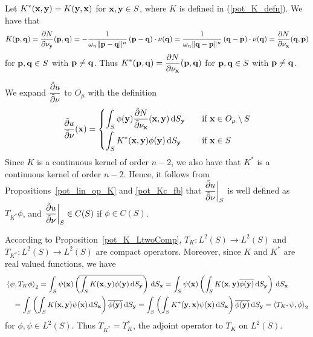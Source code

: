 Let $\displaystyle K^\ast(\mathbf{x},\mathbf{y}) = K(\mathbf{y},\mathbf{x})$
for $\mathbf{x},\mathbf{y} \in S$,  where $K$ is defined in
(\ref{pot_K_defn}).  We have that
\[
K(\mathbf{p},\mathbf{q}) = \frac{\partial{N}}{\partial \mathbf{\nu}_{\mathbf{y}}}(\mathbf{p},\mathbf{q})
= - \frac{1}{\omega_n \|\mathbf{p}-\mathbf{q}\|^n}\,(\mathbf{p}-\mathbf{q})\cdot
\mathbf{\nu}(\mathbf{q})
= \frac{1}{\omega_n \|\mathbf{q}-\mathbf{p}\|^n}\,(\mathbf{q}-\mathbf{p})\cdot
\mathbf{\nu}(\mathbf{q})
= \frac{\partial{N}}{\partial \mathbf{\nu}_{\mathbf{x}}}(\mathbf{q},\mathbf{p})
\]
for $\mathbf{p} , \mathbf{q} \in S$ with $\mathbf{p} \neq \mathbf{q}$.  Thus
$\displaystyle K^\ast(\mathbf{p},\mathbf{q}) =
\frac{\partial{N}}{\partial \mathbf{\nu}_{\mathbf{x}}}(\mathbf{p},\mathbf{q})$ for
$\mathbf{p} , \mathbf{q} \in S$ with $\mathbf{p} \neq \mathbf{q}$.

We expand $\displaystyle \frac{\tilde{\partial}{u}}{\tilde{\partial}{\nu}}$ to $O_\mu$ with
the definition
\begin{equation} \label{pot_dslp_def}
\frac{\tilde{\partial}{u}}{\tilde{\partial}{\nu}}(\mathbf{x}) = 
\begin{cases}
\displaystyle
\int_S \phi(\mathbf{y}) \frac{\tilde{\partial}{N}}{\tilde{\partial}{\nu_{\mathbf{x}}}}(\mathbf{x},\mathbf{y})
\,\mathrm{d}{S}_{\mathbf{y}} & \quad \text{if} \ \mathbf{x} \in O_\mu \setminus S \\[0.8em]
\displaystyle
\int_S K^\ast(\mathbf{x},\mathbf{y}) \phi(\mathbf{y})
\,\mathrm{d}{S}_{\mathbf{y}} & \quad \text{if} \ \mathbf{x} \in S
\end{cases}
\end{equation}
Since $K$ is a continuous kernel of order $n-2$, we also have that
$\displaystyle K^\ast$ is 
a continuous kernel of order $n-2$.  Hence, it follows from
Propositions~\ref{pot_lin_op_K} and \ref{pot_Kc_fb} that
$\displaystyle \frac{\tilde{\partial}{u}}{\tilde{\partial}{\nu}} \bigg|_S$ is well defined as
$\displaystyle T_{K^\ast} \phi$, and
$\displaystyle \frac{\tilde{\partial}{u}}{\tilde{\partial}{\nu}}\bigg|_S \in C(S)$ if $\phi\in C(S)$.

According to Proposition~\ref{pot_K_LtwoComp},
$\displaystyle T_K:L^2(S)\rightarrow L^2(S)$ and
$\displaystyle T_{K^\ast}:L^2(S)\rightarrow L^2(S)$ are
compact operators.  Moreover, since $K$ and $\displaystyle K^\ast$ are
real valued functions, we have
\begin{align*}
&\left\langle{\psi} , {T_K\phi}\right\rangle_2 = \int_S \psi(\mathbf{x}) \left(
\overline{\int_S K(\mathbf{x},\mathbf{y})\phi(\mathbf{y}) \,\mathrm{d}{S}_{\mathbf{y}}} \right) \,\mathrm{d}{S}_{\mathbf{x}}
=\int_S \psi(\mathbf{x}) \left(
\int_S K(\mathbf{x},\mathbf{y})\overline{\phi(\mathbf{y})} \,\mathrm{d}{S}_{\mathbf{y}} \right)
\,\mathrm{d}{S}_{\mathbf{x}} \\
&\quad =\int_S \left( \int_S K(\mathbf{x},\mathbf{y}) \psi(\mathbf{x}) \,\mathrm{d}{S}_{\mathbf{x}}
\right) \overline{\phi(\mathbf{y})} \,\mathrm{d}{S}_{\mathbf{y}}
=\int_S \left(
\int_S K^\ast(\mathbf{y},\mathbf{x}) \psi(\mathbf{x}) \,\mathrm{d}{S}_{\mathbf{x}}
\right) \overline{\phi(\mathbf{y})} \,\mathrm{d}{S}_{\mathbf{y}} =
\left\langle{T_{K^\ast} \psi} , {\phi}\right\rangle_2
\end{align*}
for $\phi,\psi \in L^2(S)$.
Thus $\displaystyle T_{K^\ast} = T_K^\ast$, the adjoint operator to $T_K$ on
$\displaystyle L^2(S)$.

